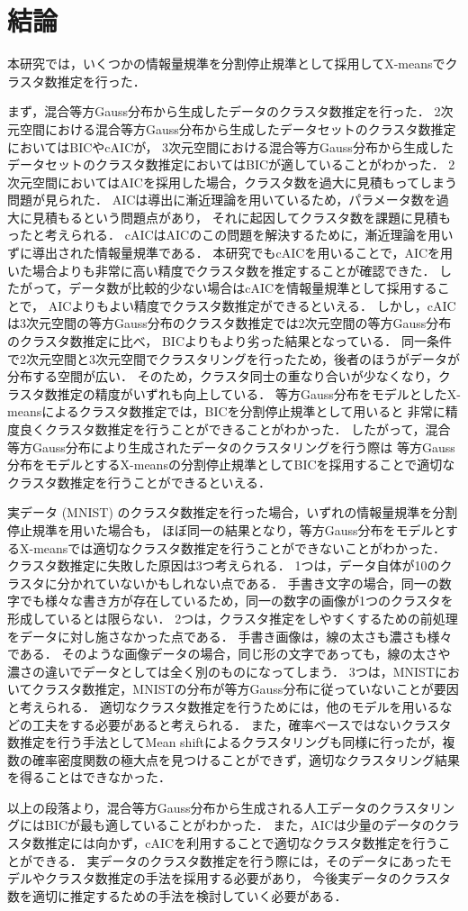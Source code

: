\section{結論}

本研究では，いくつかの情報量規準を分割停止規準として採用してX-meansでクラスタ数推定を行った．

まず，混合等方Gauss分布から生成したデータのクラスタ数推定を行った．
2次元空間における混合等方Gauss分布から生成したデータセットのクラスタ数推定においてはBICやcAICが，
3次元空間における混合等方Gauss分布から生成したデータセットのクラスタ数推定においてはBICが適していることがわかった．
2次元空間においてはAICを採用した場合，クラスタ数を過大に見積もってしまう問題が見られた．
AICは導出に漸近理論を用いているため，パラメータ数を過大に見積もるという問題点があり，
それに起因してクラスタ数を課題に見積もったと考えられる．
cAICはAICのこの問題を解決するために，漸近理論を用いずに導出された情報量規準である．
本研究でもcAICを用いることで，AICを用いた場合よりも非常に高い精度でクラスタ数を推定することが確認できた．
したがって，データ数が比較的少ない場合はcAICを情報量規準として採用することで，
AICよりもよい精度でクラスタ数推定ができるといえる．
しかし，cAICは3次元空間の等方Gauss分布のクラスタ数推定では2次元空間の等方Gauss分布のクラスタ数推定に比べ，
BICよりもより劣った結果となっている．
同一条件で2次元空間と3次元空間でクラスタリングを行ったため，後者のほうがデータが分布する空間が広い．
そのため，クラスタ同士の重なり合いが少なくなり，クラスタ数推定の精度がいずれも向上している．
等方Gauss分布をモデルとしたX-meansによるクラスタ数推定では，BICを分割停止規準として用いると
非常に精度良くクラスタ数推定を行うことができることがわかった．
したがって，混合等方Gauss分布により生成されたデータのクラスタリングを行う際は
等方Gauss分布をモデルとするX-meansの分割停止規準としてBICを採用することで適切なクラスタ数推定を行うことができるといえる．

実データ (MNIST) のクラスタ数推定を行った場合，いずれの情報量規準を分割停止規準を用いた場合も，
ほぼ同一の結果となり，等方Gauss分布をモデルとするX-meansでは適切なクラスタ数推定を行うことができないことがわかった．
クラスタ数推定に失敗した原因は3つ考えられる．
1つは，データ自体が10のクラスタに分かれていないかもしれない点である．
手書き文字の場合，同一の数字でも様々な書き方が存在しているため，同一の数字の画像が1つのクラスタを形成しているとは限らない．
2つは，クラスタ推定をしやすくするための前処理をデータに対し施さなかった点である．
手書き画像は，線の太さも濃さも様々である．
そのような画像データの場合，同じ形の文字であっても，線の太さや濃さの違いでデータとしては全く別のものになってしまう．
3つは，MNISTにおいてクラスタ数推定，MNISTの分布が等方Gauss分布に従っていないことが要因と考えられる．
適切なクラスタ数推定を行うためには，他のモデルを用いるなどの工夫をする必要があると考えられる．
また，確率ベースではないクラスタ数推定を行う手法としてMean shiftによるクラスタリングも同様に行ったが，複数の確率密度関数の極大点を見つけることができず，適切なクラスタリング結果を得ることはできなかった．

以上の段落より，混合等方Gauss分布から生成される人工データのクラスタリングにはBICが最も適していることがわかった．
また，AICは少量のデータのクラスタ数推定には向かず，cAICを利用することで適切なクラスタ数推定を行うことができる．
実データのクラスタ数推定を行う際には，そのデータにあったモデルやクラスタ数推定の手法を採用する必要があり，
今後実データのクラスタ数を適切に推定するための手法を検討していく必要がある．
